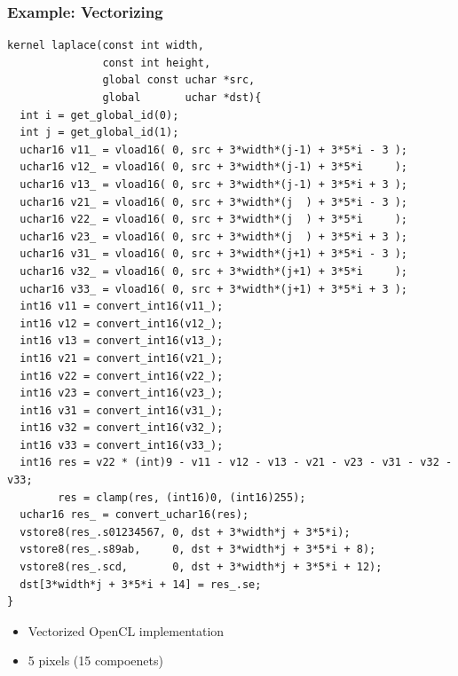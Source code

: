 \documentclass{beamer}
\begin{document}
\begin{frame}[fragile]
  \frametitle{Example: Vectorizing}
\lstset{style=CL}
\fontsize{3}{3}\selectfont
\begin{lstlisting}
kernel laplace(const int width,
               const int height,
               global const uchar *src,
               global       uchar *dst){
  int i = get_global_id(0);
  int j = get_global_id(1);
  uchar16 v11_ = vload16( 0, src + 3*width*(j-1) + 3*5*i - 3 );
  uchar16 v12_ = vload16( 0, src + 3*width*(j-1) + 3*5*i     );
  uchar16 v13_ = vload16( 0, src + 3*width*(j-1) + 3*5*i + 3 );
  uchar16 v21_ = vload16( 0, src + 3*width*(j  ) + 3*5*i - 3 );
  uchar16 v22_ = vload16( 0, src + 3*width*(j  ) + 3*5*i     );
  uchar16 v23_ = vload16( 0, src + 3*width*(j  ) + 3*5*i + 3 );
  uchar16 v31_ = vload16( 0, src + 3*width*(j+1) + 3*5*i - 3 );
  uchar16 v32_ = vload16( 0, src + 3*width*(j+1) + 3*5*i     );
  uchar16 v33_ = vload16( 0, src + 3*width*(j+1) + 3*5*i + 3 );
  int16 v11 = convert_int16(v11_);
  int16 v12 = convert_int16(v12_);
  int16 v13 = convert_int16(v13_);
  int16 v21 = convert_int16(v21_);
  int16 v22 = convert_int16(v22_);
  int16 v23 = convert_int16(v23_);
  int16 v31 = convert_int16(v31_);
  int16 v32 = convert_int16(v32_);
  int16 v33 = convert_int16(v33_);
  int16 res = v22 * (int)9 - v11 - v12 - v13 - v21 - v23 - v31 - v32 - v33;
        res = clamp(res, (int16)0, (int16)255);
  uchar16 res_ = convert_uchar16(res);
  vstore8(res_.s01234567, 0, dst + 3*width*j + 3*5*i);
  vstore8(res_.s89ab,     0, dst + 3*width*j + 3*5*i + 8);
  vstore8(res_.scd,       0, dst + 3*width*j + 3*5*i + 12);
  dst[3*width*j + 3*5*i + 14] = res_.se;
}
\end{lstlisting}
\begin{itemize}
\item Vectorized OpenCL implementation
\item 5 pixels (15 compoenets)
\end{itemize}
\end{frame}
\end{document}
